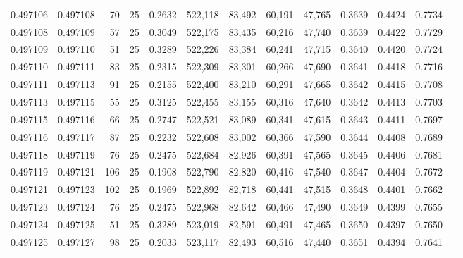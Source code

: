 \begin{tabular}{rrrrrrrrrrrrr}
0.497106 & 0.497108 &    70 &  25 &                                     0.2632 & 522,118 &  83,492 &  60,191 &  47,765 & 0.3639 & 0.4424 & 0.7734 \\
0.497108 & 0.497109 &    57 &  25 &                                     0.3049 & 522,175 &  83,435 &  60,216 &  47,740 & 0.3639 & 0.4422 & 0.7729 \\
0.497109 & 0.497110 &    51 &  25 &                                     0.3289 & 522,226 &  83,384 &  60,241 &  47,715 & 0.3640 & 0.4420 & 0.7724 \\
0.497110 & 0.497111 &    83 &  25 &                                     0.2315 & 522,309 &  83,301 &  60,266 &  47,690 & 0.3641 & 0.4418 & 0.7716 \\
0.497111 & 0.497113 &    91 &  25 &                                     0.2155 & 522,400 &  83,210 &  60,291 &  47,665 & 0.3642 & 0.4415 & 0.7708 \\
0.497113 & 0.497115 &    55 &  25 &                                     0.3125 & 522,455 &  83,155 &  60,316 &  47,640 & 0.3642 & 0.4413 & 0.7703 \\
0.497115 & 0.497116 &    66 &  25 &                                     0.2747 & 522,521 &  83,089 &  60,341 &  47,615 & 0.3643 & 0.4411 & 0.7697 \\
0.497116 & 0.497117 &    87 &  25 &                                     0.2232 & 522,608 &  83,002 &  60,366 &  47,590 & 0.3644 & 0.4408 & 0.7689 \\
0.497118 & 0.497119 &    76 &  25 &                                     0.2475 & 522,684 &  82,926 &  60,391 &  47,565 & 0.3645 & 0.4406 & 0.7681 \\
0.497119 & 0.497121 &   106 &  25 &                                     0.1908 & 522,790 &  82,820 &  60,416 &  47,540 & 0.3647 & 0.4404 & 0.7672 \\
0.497121 & 0.497123 &   102 &  25 &                                     0.1969 & 522,892 &  82,718 &  60,441 &  47,515 & 0.3648 & 0.4401 & 0.7662 \\
0.497123 & 0.497124 &    76 &  25 &                                     0.2475 & 522,968 &  82,642 &  60,466 &  47,490 & 0.3649 & 0.4399 & 0.7655 \\
0.497124 & 0.497125 &    51 &  25 &                                     0.3289 & 523,019 &  82,591 &  60,491 &  47,465 & 0.3650 & 0.4397 & 0.7650 \\
0.497125 & 0.497127 &    98 &  25 &                                     0.2033 & 523,117 &  82,493 &  60,516 &  47,440 & 0.3651 & 0.4394 & 0.7641 \\

\end{tabular}
